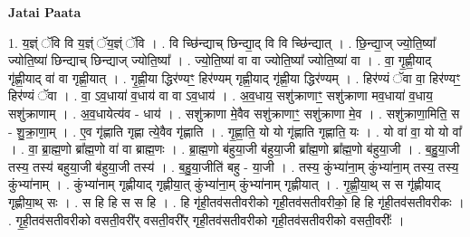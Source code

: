 \documentclass[17pt]{extarticle}
\begin{document}
\textbf{Jatai Paata} \newline

1. य॒ज्ञ्ं ॅवि वि य॒ज्ञ्ं ॅय॒ज्ञ्ं ॅवि । . वि च्छि॑न्द्याच् छिन्द्या॒द् वि वि च्छि॑न्द्यात् । . छि॒न्द्या॒ज् ज्यो॒ति॒ष्या᳚ ज्योति॒ष्या॑ छिन्द्याच् छिन्द्याज् ज्योति॒ष्या᳚ । . ज्यो॒ति॒ष्या॑ वा वा ज्योति॒ष्या᳚ ज्योति॒ष्या॑ वा । . वा॒ गृ॒ह्णी॒याद् गृ॑ह्णी॒याद् वा॑ वा गृह्णी॒यात् । . गृ॒ह्णी॒या द्धिर॑ण्यꣳ॒॒ हिर॑ण्यम् गृह्णी॒याद् गृ॑ह्णी॒या द्धिर॑ण्यम् । . हिर॑ण्यं ॅवा वा॒ हिर॑ण्यꣳ॒॒ हिर॑ण्यं ॅवा । . वा॒ ऽव॒धाया॑ व॒धाय॑ वा वा ऽव॒धाय॑ । . अ॒व॒धाय॒ सशु॑क्राणाꣳ॒॒ सशु॑क्राणा मव॒धाया॑ व॒धाय॒ सशु॑क्राणाम् । . अ॒व॒धायेत्य॑व - धाय॑ । . सशु॑क्राणा मे॒वैव सशु॑क्राणाꣳ॒॒ सशु॑क्राणा मे॒व । . सशु॑क्राणा॒मिति॒ स - शु॒क्रा॒णा॒म् । . ए॒व गृ॑ह्णाति गृह्णा त्ये॒वैव गृ॑ह्णाति । . गृ॒ह्णा॒ति॒ यो यो गृ॑ह्णाति गृह्णाति॒ यः । . यो वा॑ वा॒ यो यो वा᳚ । . वा॒ ब्रा॒ह्म॒णो ब्रा᳚ह्म॒णो वा॑ वा ब्राह्म॒णः । . ब्रा॒ह्म॒णो ब॑हुया॒जी ब॑हुया॒जी ब्रा᳚ह्म॒णो ब्रा᳚ह्म॒णो ब॑हुया॒जी । . ब॒हु॒या॒जी तस्य॒ तस्य॑ बहुया॒जी ब॑हुया॒जी तस्य॑ । . ब॒हु॒या॒जीति॑ बहु - या॒जी । . तस्य॒ कुंभ्या॑ना॒म् कुंभ्या॑ना॒म् तस्य॒ तस्य॒ कुंभ्या॑नाम् । . कुंभ्या॑नाम् गृह्णीयाद् गृह्णीया॒त् कुंभ्या॑ना॒म् कुंभ्या॑नाम् गृह्णीयात् । . गृ॒ह्णी॒या॒थ् स स गृ॑ह्णीयाद् गृह्णीया॒थ् सः । . स हि हि स स हि । . हि गृ॑ही॒तव॑सतीवरीको गृही॒तव॑सतीवरीको॒ हि हि गृ॑ही॒तव॑सतीवरीकः । . गृ॒ही॒तव॑सतीवरीको वसती॒वरी᳚र् वसती॒वरी᳚र् गृही॒तव॑सतीवरीको गृही॒तव॑सतीवरीको वसती॒वरीः᳚ । \newline
\end{document}
